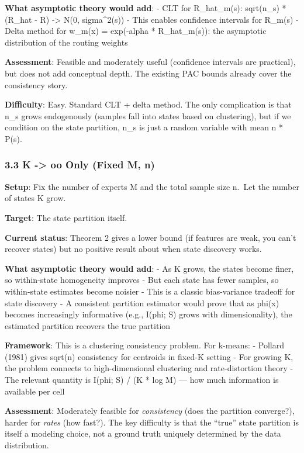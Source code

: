 \documentclass[
  12pt,
]{article}
\begin{document}
\textbf{What asymptotic theory would add}: - CLT for R\_hat\_m(s):
sqrt(n\_s) * (R\_hat - R) -\textgreater{} N(0, sigma\^{}2(s)) - This
enables confidence intervals for R\_m(s) - Delta method for w\_m(x) =
exp(-alpha * R\_hat\_m(s)): the asymptotic distribution of the routing
weights

\textbf{Assessment}: Feasible and moderately useful (confidence
intervals are practical), but does not add conceptual depth. The
existing PAC bounds already cover the consistency story.

\textbf{Difficulty}: Easy. Standard CLT + delta method. The only
complication is that n\_s grows endogenously (samples fall into states
based on clustering), but if we condition on the state partition, n\_s
is just a random variable with mean n * P(s).

\subsubsection{3.3 K -\textgreater{} oo Only (Fixed M,
n)}\label{k---oo-only-fixed-m-n}

\textbf{Setup}: Fix the number of experts M and the total sample size
n.~Let the number of states K grow.

\textbf{Target}: The state partition itself.

\textbf{Current status}: Theorem 2 gives a lower bound (if features are
weak, you can't recover states) but no positive result about when state
discovery works.

\textbf{What asymptotic theory would add}: - As K grows, the states
become finer, so within-state homogeneity improves - But each state has
fewer samples, so within-state estimates become noisier - This is a
classic bias-variance tradeoff for state discovery - A consistent
partition estimator would prove that as phi(x) becomes increasingly
informative (e.g., I(phi; S) grows with dimensionality), the estimated
partition recovers the true partition

\textbf{Framework}: This is a clustering consistency problem. For
k-means: - Pollard (1981) gives sqrt(n) consistency for centroids in
fixed-K setting - For growing K, the problem connects to
high-dimensional clustering and rate-distortion theory - The relevant
quantity is I(phi; S) / (K * log M) --- how much information is
available per cell

\textbf{Assessment}: Moderately feasible for \emph{consistency} (does
the partition converge?), harder for \emph{rates} (how fast?). The key
difficulty is that the ``true'' state partition is itself a modeling
choice, not a ground truth uniquely determined by the data distribution.
\end{document}
